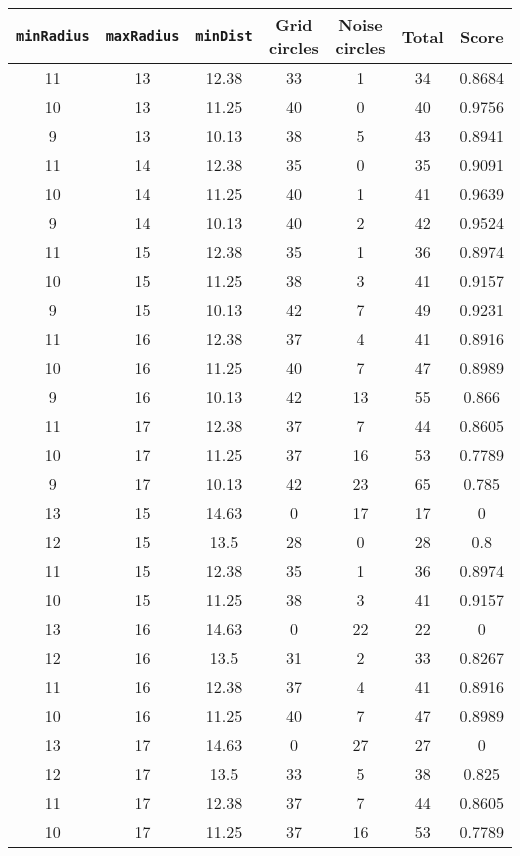 \documentclass[letterpaper, 12pt]{article}
\begin{document}
\begin{longtable}{|c|c|c|c|c|c|c|}
\hline
\textbf{\texttt{minRadius}} & \textbf{\texttt{maxRadius}} & \textbf{\texttt{minDist}} & \textbf{Grid circles} & \textbf{Noise circles} & \textbf{Total} & \textbf{Score} \\
\hline
11 & 13 & 12.38 & 33 & 1 & 34 & 0.8684 \\
\hline
10 & 13 & 11.25 & 40 & 0 & 40 & 0.9756 \\
\hline
9 & 13 & 10.13 & 38 & 5 & 43 & 0.8941 \\
\hline
11 & 14 & 12.38 & 35 & 0 & 35 & 0.9091 \\
\hline
10 & 14 & 11.25 & 40 & 1 & 41 & 0.9639 \\
\hline
9 & 14 & 10.13 & 40 & 2 & 42 & 0.9524 \\
\hline
11 & 15 & 12.38 & 35 & 1 & 36 & 0.8974 \\
\hline
10 & 15 & 11.25 & 38 & 3 & 41 & 0.9157 \\
\hline
9 & 15 & 10.13 & 42 & 7 & 49 & 0.9231 \\
\hline
11 & 16 & 12.38 & 37 & 4 & 41 & 0.8916 \\
\hline
10 & 16 & 11.25 & 40 & 7 & 47 & 0.8989 \\
\hline
9 & 16 & 10.13 & 42 & 13 & 55 & 0.866 \\
\hline
11 & 17 & 12.38 & 37 & 7 & 44 & 0.8605 \\
\hline
10 & 17 & 11.25 & 37 & 16 & 53 & 0.7789 \\
\hline
9 & 17 & 10.13 & 42 & 23 & 65 & 0.785 \\
\hline
13 & 15 & 14.63 & 0 & 17 & 17 & 0 \\
\hline
12 & 15 & 13.5 & 28 & 0 & 28 & 0.8 \\
\hline
11 & 15 & 12.38 & 35 & 1 & 36 & 0.8974 \\
\hline
10 & 15 & 11.25 & 38 & 3 & 41 & 0.9157 \\
\hline
13 & 16 & 14.63 & 0 & 22 & 22 & 0 \\
\hline
12 & 16 & 13.5 & 31 & 2 & 33 & 0.8267 \\
\hline
11 & 16 & 12.38 & 37 & 4 & 41 & 0.8916 \\
\hline
10 & 16 & 11.25 & 40 & 7 & 47 & 0.8989 \\
\hline
13 & 17 & 14.63 & 0 & 27 & 27 & 0 \\
\hline
12 & 17 & 13.5 & 33 & 5 & 38 & 0.825 \\
\hline
11 & 17 & 12.38 & 37 & 7 & 44 & 0.8605 \\
\hline
10 & 17 & 11.25 & 37 & 16 & 53 & 0.7789 \\

\end{longtable}
\end{document}
